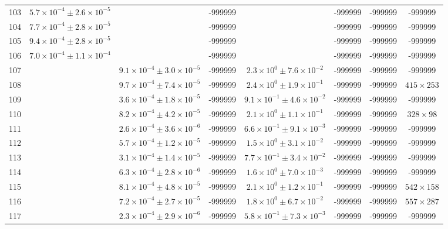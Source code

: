 \begin{table}
\begin{tabular}{cccccccc}
103 & $5.7\times10^{-4}\pm 2.6\times10^{-5}$ &  & -999999 &  & -999999 & -999999 & -999999 \\
104 & $7.7\times10^{-4}\pm 2.8\times10^{-5}$ &  & -999999 &  & -999999 & -999999 & -999999 \\
105 & $9.4\times10^{-4}\pm 2.8\times10^{-5}$ &  & -999999 &  & -999999 & -999999 & -999999 \\
106 & $7.0\times10^{-4}\pm 1.1\times10^{-4}$ &  & -999999 &  & -999999 & -999999 & -999999 \\
107 &  & $9.1\times10^{-4}\pm 3.0\times10^{-5}$ & -999999 & $2.3\times10^{0}\pm 7.6\times10^{-2}$ & -999999 & -999999 & -999999 \\
108 &  & $9.7\times10^{-4}\pm 7.4\times10^{-5}$ & -999999 & $2.4\times10^{0}\pm 1.9\times10^{-1}$ & -999999 & -999999 & $415\times 253$ \\
109 &  & $3.6\times10^{-4}\pm 1.8\times10^{-5}$ & -999999 & $9.1\times10^{-1}\pm 4.6\times10^{-2}$ & -999999 & -999999 & -999999 \\
110 &  & $8.2\times10^{-4}\pm 4.2\times10^{-5}$ & -999999 & $2.1\times10^{0}\pm 1.1\times10^{-1}$ & -999999 & -999999 & $328\times 98$ \\
111 &  & $2.6\times10^{-4}\pm 3.6\times10^{-6}$ & -999999 & $6.6\times10^{-1}\pm 9.1\times10^{-3}$ & -999999 & -999999 & -999999 \\
112 &  & $5.7\times10^{-4}\pm 1.2\times10^{-5}$ & -999999 & $1.5\times10^{0}\pm 3.1\times10^{-2}$ & -999999 & -999999 & -999999 \\
113 &  & $3.1\times10^{-4}\pm 1.4\times10^{-5}$ & -999999 & $7.7\times10^{-1}\pm 3.4\times10^{-2}$ & -999999 & -999999 & -999999 \\
114 &  & $6.3\times10^{-4}\pm 2.8\times10^{-6}$ & -999999 & $1.6\times10^{0}\pm 7.0\times10^{-3}$ & -999999 & -999999 & -999999 \\
115 &  & $8.1\times10^{-4}\pm 4.8\times10^{-5}$ & -999999 & $2.1\times10^{0}\pm 1.2\times10^{-1}$ & -999999 & -999999 & $542\times 158$ \\
116 &  & $7.2\times10^{-4}\pm 2.7\times10^{-5}$ & -999999 & $1.8\times10^{0}\pm 6.7\times10^{-2}$ & -999999 & -999999 & $557\times 287$ \\
117 &  & $2.3\times10^{-4}\pm 2.9\times10^{-6}$ & -999999 & $5.8\times10^{-1}\pm 7.3\times10^{-3}$ & -999999 & -999999 & -999999 \\
\end{tabular}
\end{table}
